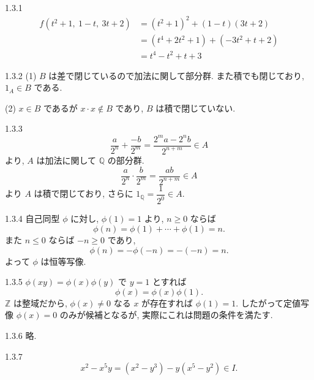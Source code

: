 \begin{ans}{1.3.1}
  \begin{align*}
    f(t^2+1,\ 1-t,\ 3t+2)
    &= (t^2+1)^2 + (1-t)(3t+2) \\
    &= (t^4 + 2t^2 + 1) + (-3t^2 + t + 2) \\
    &= t^4 - t^2 + t + 3
  \end{align*}
\end{ans}

\begin{ans}{1.3.2}
  (1) $B$ は差で閉じているので加法に関して部分群. また積でも閉じており, $1_A \in B$ である.

  (2) $x \in B$ であるが $x \cdot x \notin B$ であり, $B$ は積で閉じていない.
\end{ans}

\begin{ans}{1.3.3}
  \[
    \frac{a}{2^n} + \frac{-b}{2^m} = \frac{2^m a - 2^n b}{2^{n+m}} \in A
  \]
  より, $A$ は加法に関して $\mathbb{Q}$ の部分群.
  \[
    \frac{a}{2^n} \cdot \frac{b}{2^m} = \frac{ab}{2^{n+m}} \in A
  \]
  より $A$ は積で閉じており, さらに $1_{\mathbb{Q}} = \dfrac{1}{2^0} \in A$.
\end{ans}

\begin{ans}{1.3.4}
  自己同型 $\phi$ に対し, $\phi(1) = 1$ より, $n \geq 0$ ならば
  \[
    \phi(n) = \phi(1) + \cdots + \phi(1) = n.
  \]
  また $n \leq 0$ ならば $-n \geq 0$ であり,
  \[
    \phi(n) = -\phi(-n) = -(-n) = n.
  \]
  よって $\phi$ は恒等写像.
\end{ans}

\begin{ans}{1.3.5}
  $\phi(xy) = \phi(x)\phi(y)$ で $y = 1$ とすれば
  \[
    \phi(x) = \phi(x)\phi(1).
  \]
  $\mathbb{Z}$ は整域だから, $\phi(x) \neq 0$ なる $x$ が存在すれば $\phi(1) = 1$.
  したがって定値写像 $\phi(x) = 0$ のみが候補となるが, 実際にこれは問題の条件を満たす.
\end{ans}

\begin{ans}{1.3.6}
  略.
\end{ans}

\begin{ans}{1.3.7}
  \[
    x^2 - x^5 y = (x^2 - y^3) - y(x^5 - y^2) \in I.
  \]
\end{ans}

